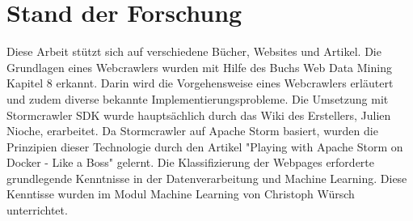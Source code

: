 \chapter{Stand der Forschung}
Diese Arbeit stützt sich auf verschiedene Bücher, Websites und Artikel.
Die Grundlagen eines Webcrawlers wurden mit Hilfe des Buchs \glqq Web Data Mining\grqq{} Kapitel 8 erkannt. %
Darin wird die Vorgehensweise eines Webcrawlers erläutert und zudem diverse bekannte Implementierungsprobleme.
Die Umsetzung mit Stormcrawler SDK wurde hauptsächlich durch das Wiki des Erstellers, Julien Nioche, erarbeitet. %
Da Stormcrawler auf Apache Storm basiert, wurden die Prinzipien dieser Technologie durch den Artikel "Playing with Apache Storm on Docker - Like a Boss" gelernt. %
Die Klassifizierung der Webpages erforderte grundlegende Kenntnisse in der Datenverarbeitung und Machine Learning.
Diese Kenntisse wurden im Modul \glqq Machine Learning\grqq{} von Christoph Würsch unterrichtet. %

